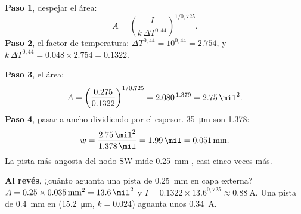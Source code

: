 \begin{calculo}
\textbf{Paso 1}, despejar el área:
\begin{equation}
A = \left(\frac{I}{k\,\Delta T^{0,44}}\right)^{1/0,725}.
\end{equation}
\textbf{Paso 2}, el factor de temperatura: $\Delta T^{0,44} = 10^{0,44} = \num{2.754}$, y
$k\,\Delta T^{0,44} = \num{0.048}\times\num{2.754} = \num{0.1322}$.

\textbf{Paso 3}, el área:
\begin{equation}
A = \left(\frac{\num{0.275}}{\num{0.1322}}\right)^{1/0,725} = \num{2.080}^{\,\num{1.379}} = \SI{2.75}{\mil\squared}.
\end{equation}
\textbf{Paso 4}, pasar a ancho dividiendo por el espesor. \SI{35}{\micro\meter} son \SI{1.378}{\mil}:
\begin{equation}
w = \frac{\SI{2.75}{\mil\squared}}{\SI{1.378}{\mil}} = \SI{1.99}{\mil} = \SI{0.051}{\milli\meter}.
\end{equation}
La pista más angosta del nodo SW mide \SI{0.25}{\milli\meter} \medido, casi cinco veces más.

\textbf{Al revés}, ¿cuánto aguanta una pista de \SI{0.25}{\milli\meter} en capa externa?
$A = \num{0.25}\times\SI{0.035}{\milli\meter\squared} = \SI{13.6}{\mil\squared}$ y
$I = \num{0.1322}\times\num{13.6}^{0,725} \approx \SI{0.88}{\ampere}$.
Una pista de \SI{0.4}{\milli\meter} en  (\SI{15.2}{\micro\meter}, $k=\num{0.024}$) aguanta
unos \SI{0.34}{\ampere}.
\end{calculo}

